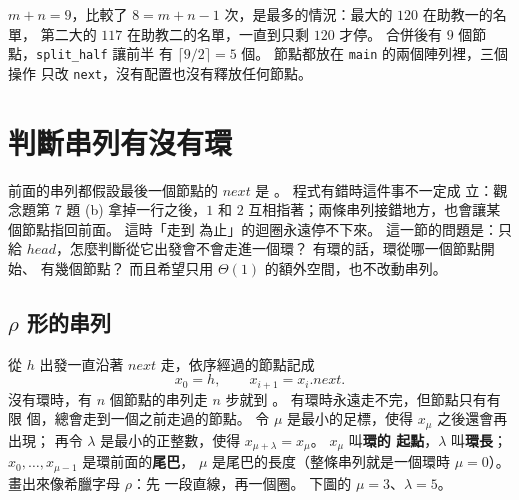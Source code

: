 $m + n = 9$，比較了 $8 = m + n - 1$ 次，是最多的情況：最大的 $120$ 在助教一的名單，
第二大的 $117$ 在助教二的名單，一直到只剩 $120$ 才停。 合併後有 $9$ 個節點，\texttt{split\_half} 讓前半
有 $\lceil 9/2 \rceil = 5$ 個。 節點都放在 \texttt{main} 的兩個陣列裡，三個操作
只改 \texttt{next}，沒有配置也沒有釋放任何節點。

\section{判斷串列有沒有環}
\label{sec:ll-cycle}

前面的串列都假設最後一個節點的 $\mathit{next}$ 是 \NIL。 程式有錯時這件事不一定成
立：觀念題第 7 題 (b) 拿掉一行之後，$1$ 和 $2$ 互相指著；兩條串列接錯地方，也會讓某
個節點指回前面。 這時「走到 \NIL 為止」的迴圈永遠停不下來。 這一節的問題是：只給
$\mathit{head}$，怎麼判斷從它出發會不會走進一個環？ 有環的話，環從哪一個節點開始、
有幾個節點？ 而且希望只用 $\Theta(1)$ 的額外空間，也不改動串列。

\subsection{$\rho$ 形的串列}

從 $h$ 出發一直沿著 $\mathit{next}$ 走，依序經過的節點記成
\[
x_0 = h, \qquad x_{i+1} = x_i.\mathit{next}.
\]
沒有環時，有 $n$ 個節點的串列走 $n$ 步就到 \NIL。 有環時永遠走不完，但節點只有有限
個，總會走到一個之前走過的節點。 令 $\mu$ 是最小的足標，使得 $x_\mu$ 之後還會再出現；
再令 $\lambda$ 是最小的正整數，使得 $x_{\mu+\lambda} = x_\mu$。 $x_\mu$ 叫\textbf{環的
起點}，$\lambda$ 叫\textbf{環長}；$x_0, \ldots, x_{\mu-1}$ 是環前面的\textbf{尾巴}，
$\mu$ 是尾巴的長度（整條串列就是一個環時 $\mu = 0$）。 畫出來像希臘字母 $\rho$：先
一段直線，再一個圈。 下圖的 $\mu = 3$、$\lambda = 5$。

\begin{center}
\label{fig:ll-rho}
\end{center}

